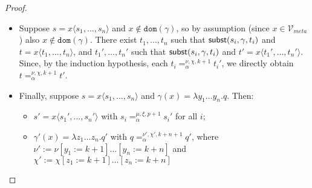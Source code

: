 \documentclass{lmcs}
\theoremstyle{theorem}\newtheorem{theorem}{Theorem}
\theoremstyle{theorem}\newtheorem{lemma}[theorem]{Lemma}
\theoremstyle{theorem}\newtheorem{corollary}[theorem]{Corollary}
\theoremstyle{definition}\newtheorem{definition}[theorem]{Definition}
\theoremstyle{definition}\newtheorem{example}[theorem]{Example}
\newcommand{\Vmeta}{\mathcal{V}_{\mathit{meta}}}
\newcommand{\FV}{\mathit{FV}}
\newcommand{\domain}{\mathtt{dom}}
\newcommand{\avar}{x}
\newcommand{\bvar}{y}
\newcommand{\cvar}{z}
\newcommand{\abs}[2]{\lambda #1.#2}
\newcommand{\meta}[2]{#1\langle#2\rangle}
\begin{document}
\begin{proof}
{\begin{itemize}
      Alternatively, if $y \neq x$, then $\mu_b(y) = \mu(y) \leq p$.
      \begin{itemize}
      \item If $\mu_b(y) > 0$ and $y' \in \FV(u')$ has $\mu_b(y) = \xi_b(y')$, then note that $y' \neq x'$, as $\xi_b(x') = p+1 > \mu_b(y)$.
        Hence, $\xi_b(y') = \xi(y')$.
      \item Otherwise, $y' = y$ by definition and since $y \in \FV(u) \setminus \{ x \} = \FV(s)$ we can apply Lemma \ref{lem:alphafreevar}
        to obtain $y \in \FV(s')$ and $\xi(y) = 0$; so $y \in \FV(u')$ and $y \neq x'$, hence $\xi_b(y) = \xi(y) = 0$.\\
      \end{itemize}
      Hence, either way, $y' \neq x'$ and $\xi_b(y') = \xi(y')$.
      Then also $\delta(y) = \gamma(y)$ and $\delta'(y') = \gamma'(y')$, and by the assumptions on $\gamma,\gamma'$ we have:
      $\delta(y) =_\alpha^{\nu,\chi,k+1} \delta'(y)$.
      Hence by Lemma \ref{lem:alphaincrease}, $\delta(y) =_\alpha^{\nu,\chi,k+2} \delta'(y)$. (a) \\
      Now, since $y \in \FV(u)$ and $y \neq x$, we have $y \in \FV(s)$.  Similarly, $y' \in \FV(s')$.
      By the freshness condition on $z,z'$ we have: $z \notin \FV(\gamma(y)) = \FV(\delta(y))$, and $z' \notin \FV(\delta'(y'))$.
      But then by (a) and Lemma \ref{lem:alphaunusedvar}, $\delta(w) =_\alpha^{\nu_b,\chi_b,k+2} \delta'(w')$ as required.
    \item Suppose $s = \meta{\avar}{s_1,\dots,s_n}$ and $\avar \notin \domain(\gamma)$, so by assumption (since $\avar \in \Vmeta$)
      also $\avar \notin \domain(\gamma)$.  There exist $t_1,\dots,t_n$ such that $\mathsf{subst}(s_i,\gamma,t_i)$ and $t =
      \meta{\avar}{t_1,\dots,t_n}$, and $t_1',\dots,t_n'$ such that $\mathsf{subst}(s_i,\gamma,t_i)$ and $t' = \meta{\avar}{t_1',\dots,t_n'}$.
      Since, by the induction hypothesis, each $t_i =_\alpha^{\nu,\chi,k+1} t_i'$, we directly obtain $t =_\alpha^{\nu,\chi,k+1} t'$.
    \item Finally, suppose $s = \meta{\avar}{s_1,\dots,s_n}$ and $\gamma(\avar) = \abs{\bvar_1 \dots \bvar_n}{q}$.  Then:
      \begin{itemize}
      \item $s' = \meta{\avar}{s_1',\dots,s_n'}$ with $s_i =_\alpha^{\mu,\xi,p+1} s_i'$ for all $i$;
      \item $\gamma'(\avar) = \abs{\cvar_1 \dots \cvar_n}{q'}$ with $q =_\alpha^{\nu',\chi',k+n+1} q'$,
        where $\nu' := \nu[\bvar_1:=k+1]\dots[\bvar_n:=k+n]$ and $\chi' := \chi[\cvar_1:=k+1]\dots[\cvar_n:=k+n]$

\end{itemize}
\end{itemize}}
\end{proof}
\end{document}
